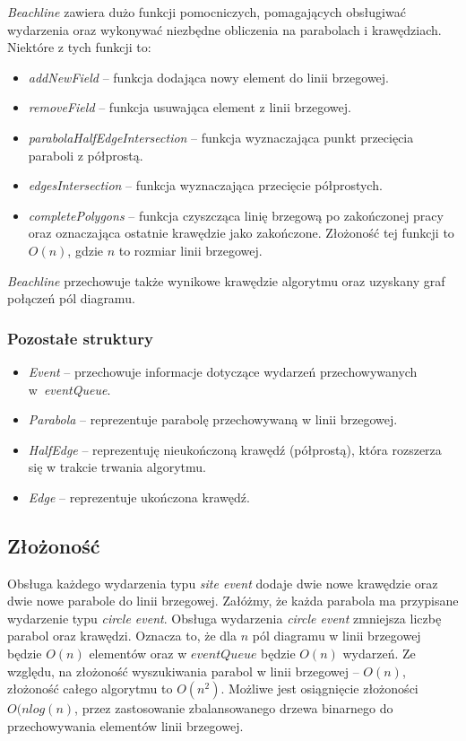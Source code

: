 \documentclass[declaration,shortabstract, inz]{iithesis}
\theoremstyle{definition} \newtheorem{definition}{Definicja}[]
\theoremstyle{plain} \newtheorem{remark}[definition]{Obserwacja}
\theoremstyle{plain} \newtheorem{theorem}[definition]{Twierdzenie}
\theoremstyle{plain} \newtheorem{example}{Przykład}[definition]
\theoremstyle{plain} \newtheorem{lemma}[definition]{Lemat}
\begin{document}
\textit{Beachline} zawiera dużo funkcji pomocniczych, pomagających obsługiwać wydarzenia oraz wykonywać niezbędne obliczenia na parabolach i krawędziach. Niektóre z tych funkcji to:

\begin{itemize}
\item \textit{addNewField} -- funkcja dodająca nowy element do linii brzegowej.
\item \textit{removeField} -- funkcja usuwająca element z linii brzegowej.
\item \textit{parabolaHalfEdgeIntersection} -- funkcja wyznaczająca punkt przecięcia paraboli z półprostą.
\item \textit{edgesIntersection} -- funkcja wyznaczająca przecięcie półprostych.
\item \textit{completePolygons} -- funkcja czyszcząca linię brzegową po zakończonej pracy oraz oznaczająca ostatnie krawędzie jako zakończone. Złożoność tej funkcji to $O(n)$, gdzie $n$ to rozmiar linii brzegowej.
\end{itemize}

\textit{Beachline} przechowuje także wynikowe krawędzie algorytmu oraz uzyskany graf połączeń pól diagramu.

\subsubsection{Pozostałe struktury}
\begin{itemize}
	\item \textit{Event} -- przechowuje informacje dotyczące wydarzeń przechowywanych w~\textit{eventQueue}.
	\item \textit{Parabola} -- reprezentuje parabolę przechowywaną w linii brzegowej.
	\item \textit{HalfEdge} -- reprezentuję nieukończoną krawędź (półprostą), która rozszerza się w trakcie trwania algorytmu.
	\item \textit{Edge} -- reprezentuje ukończona krawędź.
\end{itemize}

\subsection{Złożoność}
Obsługa każdego wydarzenia typu \textit{site event} dodaje dwie nowe krawędzie oraz dwie nowe parabole do linii brzegowej. Załóżmy, że każda parabola ma przypisane wydarzenie typu \textit{circle event}. Obsługa wydarzenia \textit{circle event} zmniejsza liczbę parabol oraz krawędzi. Oznacza to, że dla $n$ pól diagramu w linii brzegowej będzie $O(n)$ elementów oraz w $eventQueue$ będzie $O(n)$ wydarzeń. Ze względu, na złożoność wyszukiwania parabol w linii brzegowej -- $O(n)$, złożoność całego algorytmu to $O(n^2)$. Możliwe jest osiągnięcie złożoności $O(nlog(n)$, przez zastosowanie zbalansowanego drzewa binarnego do przechowywania elementów linii brzegowej.
\end{document}
